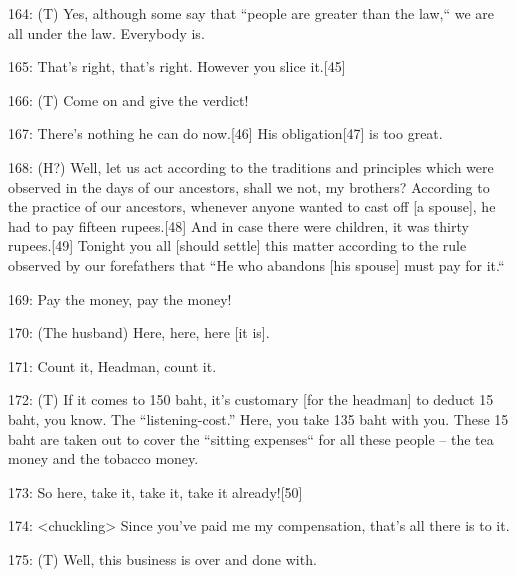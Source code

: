 {164: (T) Yes, although some say that ``people are greater than
the law,`` we are all under the law. Everybody is. }

{165: That's right, that's right. However you slice}{\textbf{ }}{it.[45]}

{166: (T) Come on and give the verdict!}

{167: There's nothing he can do now.[46] His obligation[47] is too great.
}

{168: (H?) Well, let us act according to the traditions and principles which
were observed in the days of our ancestors, shall we not, my brothers? According
to the practice of our ancestors, whenever anyone wanted to cast off [a spouse],
he had to pay fifteen rupees.[48] And in case there were children, it was thirty
rupees.[49] Tonight you all [should settle] this matter according to the rule observed
by our forefathers that ``He who abandons [his spouse] must pay for it.``}

{169: Pay the money, pay the money!}

{170: (The husband) Here, here, here [it is].}

{171: Count it, Headman, count it.}

{172: (T) If it comes to 150 baht, it's customary [for the headman] to deduct
15 baht, you know. The ``listening-cost.'' Here, you take 135 baht with
you. These 15 baht are taken out to cover the ``sitting expenses``
for all these people -- the tea money and the tobacco money.}

{173: So here, take it, take it, take it already![50]}

{174: <chuckling> Since you've paid me my compensation,
that's all there is to it. }

{175: (T) Well, this business is over and done with.  }

